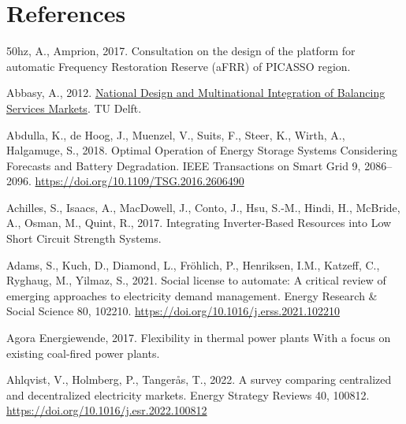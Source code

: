\documentclass[12pt,a4paper,]{report}
\newlength{\cslhangindent}
\newenvironment{CSLReferences}[2] %
 {%
  \setlength{\parindent}{0pt}
  \ifodd #1 \everypar{\setlength{\hangindent}{\cslhangindent}}\ignorespaces\fi
  \ifnum #2 > 0
  \setlength{\parskip}{#2\baselineskip}
  \fi
 }%
 {}
\begin{document}
\footnotesize
\singlespacing
\setlength{\parindent}{0in}

\hypertarget{references}{%
\chapter*{References}\label{references}}

\hypertarget{refs}{}
\begin{CSLReferences}{1}{0}
\leavevmode{}%
50hz, A., Amprion, 2017. Consultation on the design of the platform for
automatic {Frequency Restoration Reserve} ({aFRR}) of {PICASSO} region.

\leavevmode{}%
Abbasy, A., 2012.
\href{https://doi.org/10.4233/uuid:71f7138f-3af2-4bc3-b035-a3e42b3cafaf}{National
{Design} and {Multinational Integration} of {Balancing Services
Markets}}. TU Delft.

\leavevmode{}%
Abdulla, K., de Hoog, J., Muenzel, V., Suits, F., Steer, K., Wirth, A.,
Halgamuge, S., 2018. Optimal {Operation} of {Energy Storage Systems
Considering Forecasts} and {Battery Degradation}. IEEE Transactions on
Smart Grid 9, 2086--2096. \url{https://doi.org/10.1109/TSG.2016.2606490}

\leavevmode{}%
Achilles, S., Isaacs, A., MacDowell, J., Conto, J., Hsu, S.-M., Hindi,
H., McBride, A., Osman, M., Quint, R., 2017. Integrating {Inverter-Based
Resources} into {Low Short Circuit Strength Systems}.

\leavevmode{}%
Adams, S., Kuch, D., Diamond, L., Fröhlich, P., Henriksen, I.M.,
Katzeff, C., Ryghaug, M., Yilmaz, S., 2021. Social license to automate:
{A} critical review of emerging approaches to electricity demand
management. Energy Research \& Social Science 80, 102210.
\url{https://doi.org/10.1016/j.erss.2021.102210}

\leavevmode{}%
Agora Energiewende, 2017. Flexibility in thermal power plants {With} a
focus on existing coal-fired power plants.

\leavevmode{}%
Ahlqvist, V., Holmberg, P., Tangerås, T., 2022. A survey comparing
centralized and decentralized electricity markets. Energy Strategy
Reviews 40, 100812. \url{https://doi.org/10.1016/j.esr.2022.100812}


\end{CSLReferences}
\end{document}
